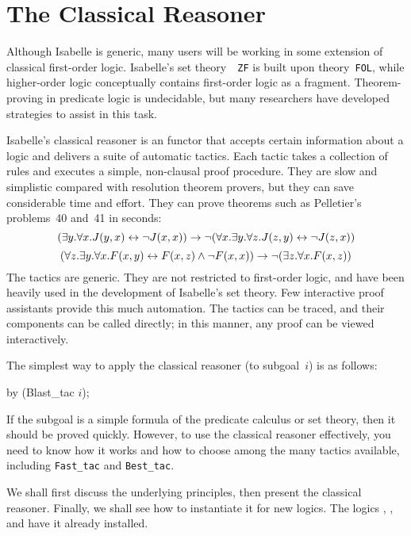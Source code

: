 \chapter{The Classical Reasoner}\label{chap:classical}
\newcommand\ainfer[2]{\begin{array}{r@{\,}l}#2\\ \hline#1\end{array}}

Although Isabelle is generic, many users will be working in some
extension of classical first-order logic.  Isabelle's set theory~{\tt
  ZF} is built upon theory~{\tt FOL}, while higher-order logic
conceptually contains first-order logic as a fragment.
Theorem-proving in predicate logic is undecidable, but many
researchers have developed strategies to assist in this task.

Isabelle's classical reasoner is an \ML{} functor that accepts certain
information about a logic and delivers a suite of automatic tactics.  Each
tactic takes a collection of rules and executes a simple, non-clausal proof
procedure.  They are slow and simplistic compared with resolution theorem
provers, but they can save considerable time and effort.  They can prove
theorems such as Pelletier's~\cite{pelletier86} problems~40 and~41 in
seconds:
\[ (\exists y. \forall x. J(y,x) \leftrightarrow \neg J(x,x))  
   \rightarrow  \neg (\forall x. \exists y. \forall z. J(z,y) \leftrightarrow \neg J(z,x)) \]
\[ (\forall z. \exists y. \forall x. F(x,y) \leftrightarrow F(x,z) \wedge \neg F(x,x))
   \rightarrow \neg (\exists z. \forall x. F(x,z))  
\]
%
The tactics are generic.  They are not restricted to first-order logic, and
have been heavily used in the development of Isabelle's set theory.  Few
interactive proof assistants provide this much automation.  The tactics can
be traced, and their components can be called directly; in this manner,
any proof can be viewed interactively.

The simplest way to apply the classical reasoner (to subgoal~$i$) is as
follows:
\begin{ttbox}
by (Blast_tac \(i\));
\end{ttbox}
If the subgoal is a simple formula of the predicate calculus or set theory,
then it should be proved quickly.  However, to use the classical reasoner
effectively, you need to know how it works and how to choose among the many
tactics available, including {\tt Fast_tac} and {\tt Best_tac}.

We shall first discuss the underlying principles, then present the
classical reasoner.  Finally, we shall see how to instantiate it for
new logics.  The logics \FOL, \ZF, {\HOL} and {\HOLCF} have it already
installed.



